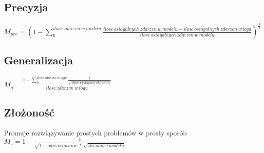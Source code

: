 \subsection{Precyzja}

$M_{pre} = (1 - \sum_{0}^{ilosc\ zdarzen\ w\ modelu} \frac{ilosc\ osiagalnych\ zdarzen\ w\ modelu - ilosc\ osiagalnych\ zdarzen\ w\ logu}{ilosc\ osiagalnych\ zdarzen\ w\ modelu})^{\frac{1}{3}} $
\subsection{Generalizacja}
$M_g = \frac{1 - \sum_{0}^{ilosc\ zdarzen\ w\ logu} \frac{1}{\sqrt{ilosc\ wystapien\ zdarzenia}}}{ilosc\ zdarzen\ w\ logu} $
\subsection{Złożoność}
Promuje rozwiązywanie prostych problemów w prosty sposób 
$M_z = 1 - \frac{1}{\sqrt{1 - odwzorowanie\ *\ \sqrt{zlozonosc\ modelu}}} $
